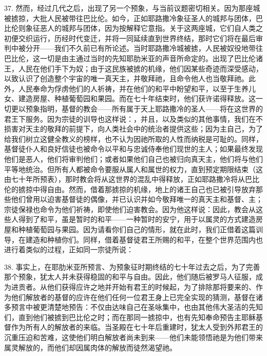 37. 然而，经过几代之后，出现了另一个预象，与当前议题密切相关。因为那座城被掳掠，大批人民被带往巴比伦。如今，正如耶路撒冷象征圣人的城邦与团体，巴比伦则象征恶人的城邦与团体，因为按解释它意指。关于这两座城，它们自人类之初便交织运行，历经时代变迁，并将一同延续直到世界终结，那时它们将在最后审判中被分开——我们不久前已有所论述。当时耶路撒冷城被掳，人民被奴役地带往巴比伦，这一切是由主通过当时的先知耶肋米亚的声音所命定的。出现了巴比伦诸王，人民在他们手下为奴；由于这民族被掳的机缘，他们因某些奇迹而深受感动，以致认识了创造整个宇宙的唯一真天主，并敬拜祂，且命令他人也当敬拜祂。此外，人民奉命为俘虏他们的人祈祷，并在他们的和平中盼望和平，以至于生养儿女、建造房屋、种植葡萄园和果园。而在七十年结束时，他们获许诺得释放。这一切更以预象指明，基督的教会——所有属于天上耶路撒冷的圣人——将在这世界的君王下服务。因为宗徒的训导也这样说：，并且，以及类似的其他事情，我们在不损害对天主的敬拜的前提下，向人类社会中的统治者提供这些；因为主自己，为了给我们树立这健全教义的榜样，也不认为因祂所取的人性而纳税是可耻的。同样，基督徒仆人和良好信徒也被命令以平和与忠诚侍奉他们现世的主人；如果最终发现他们是恶人，他们将审判他们；或者如果他们自己也被归向真天主，他们将与他们平等地统治。但所有人都被命令要服从属人和属世的权力，直到预定期限结束（这由七十年所预表），那时教会将从这世界的混乱中得释放，正如耶路撒冷将从巴比伦的掳掠中得自由。然而，借着那掳掠的机缘，地上的诸王自己也已被引导放弃那些他们曾用以迫害基督徒的偶像，并已认识并如今敬拜唯一的真天主和基督、主；宗徒保禄也命令为他们祈祷，即使他们迫害教会。因为他这样说：因此，教会从这些人得到了和平，虽是暂时的和平——一种暂时的安宁，用于以属灵的方式建造房屋和种植葡萄园与果园。因为请看你们自己的情形，就在此时，我们正借着这篇训导，在建造和种植你们。同样，借着基督徒君王所赐的和平，在整个世界范围内也进行着类似的过程，正如同一宗徒所说：\par

38. 事实上，在耶肋米亚所预言、为预象征时期终结的七十年过去之后，为了完善那个预象，犹太人并未获得稳固的和平与自由。因此，他们随后被罗马人征服，成为进贡者。从他们获得应许之地并开始有君王的时候起，为了排除那将要来的、作为他们解放者的基督的应许在他们任何一位君王身上已完全实现的猜测，基督在诸多预言中被更清楚地预告：不仅由达味自己在圣咏集中，也由其他伟大圣洁的先知们，直到他们被掳到巴比伦之时；而在那同一掳掠中，也有先知奉命预告主耶稣基督作为所有人的解放者的来临。当圣殿在七十年后重建时，犹太人受到外邦君王的沉重压迫和苦难，这使他们明白解放者尚未到来——他们未能领悟祂是为他们带来属灵解放的，而他们却因属肉体的解放而徒然渴望祂。\par

